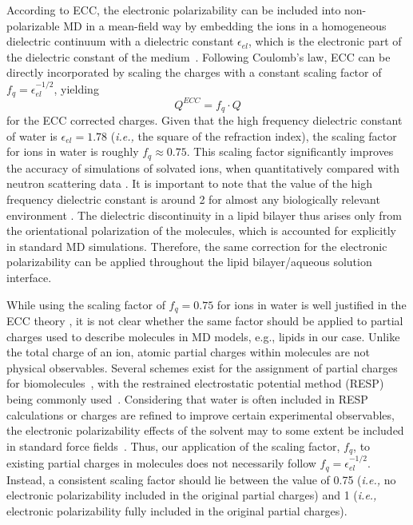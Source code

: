 \documentclass[journal=jpcbfk,manuscript=article]{achemso}
\begin{document}
According to ECC, the electronic polarizability can be included into non-polarizable MD in a mean-field way by 
embedding the ions in a homogeneous dielectric continuum with a dielectric constant $\epsilon_{el}$, which is the electronic part of the dielectric constant of the medium~\cite{leontyev11}. Following Coulomb's law,  ECC can be directly incorporated by scaling the charges with a constant scaling factor of $f_q = \epsilon _{el} ^{-1/2}$, yielding
\begin{equation}
Q^{ECC} = f_q \cdot Q
\end{equation}
for the ECC corrected charges. 
Given that the  high frequency dielectric constant of water is $\epsilon _{el} = 1.78$ (\textit{i.e.,} the square of the refraction index), the scaling factor for ions in water is roughly $f_q \approx 0.75$. This scaling factor significantly improves the accuracy of simulations of solvated ions, when quantitatively compared with neutron scattering data \cite{kohagen14,kohagen16, Pluharova2014, martinek17}.
It is important to note that the value of the
high frequency dielectric constant 
is around 2 for almost any biologically relevant environment \cite{leontyev11}.
The dielectric discontinuity in a lipid bilayer thus arises only
from the orientational polarization of the molecules, which is accounted for explicitly in standard MD simulations. 
Therefore, the same correction for the electronic polarizability can be 
applied throughout the lipid bilayer/aqueous solution interface.

While using the scaling factor of $f_q = 0.75$ for ions in water is well justified in the ECC theory \cite{leontyev11}, it is not clear whether the same factor should be applied to partial charges used to describe molecules in MD models, e.g., lipids in our case. Unlike the total charge of an ion, atomic partial charges within molecules are not physical observables. Several schemes exist for the assignment of partial charges for biomolecules~\cite{Hu2007}, with the restrained electrostatic potential method (RESP) being commonly used~\cite{RESP_paper, Singh1984}. Considering that water is often included in RESP calculations or charges are refined to improve certain experimental observables, the electronic polarizability effects of the solvent may to some extent be included in standard force fields~\cite{RESP_paper, Singh1984, jorgensen96, ipolq2013, benavides17}. Thus, our application of the scaling factor, $f_q$, to existing partial charges in molecules does not necessarily follow $f_q = \epsilon _{el} ^{-1/2}$. Instead, a consistent scaling factor should lie between the value of 0.75  (\textit{i.e.,} no electronic polarizability included in the original partial charges) and 1 (\textit{i.e.,} electronic polarizability fully included in the original partial charges). 
\end{document}
